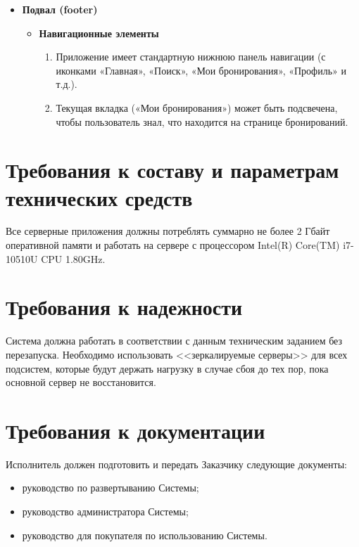 \begin{enumerate}
\begin{itemize}
            \item \textbf{Подвал (footer)}
            \begin{itemize}
                \item \textbf{Навигационные элементы}
                \begin{enumerate}
                    \item Приложение имеет стандартную нижнюю панель навигации (с иконками «Главная», «Поиск», «Мои бронирования», «Профиль» и т.д.).
                    \item Текущая вкладка («Мои бронирования») может быть подсвечена, чтобы пользователь знал, что находится на странице бронирований.
                \end{enumerate}
            \end{itemize}
        \end{itemize}    

\end{enumerate}

\section*{Требования к составу и параметрам технических средств}

Все серверные приложения должны потреблять суммарно не более 2 Гбайт оперативной памяти и работать на сервере с процессором Intel(R) Core(TM) i7- 10510U CPU 1.80GHz.

\section*{Требования к надежности}

Система должна работать в соответствии с данным техническим заданием без перезапуска.
Необходимо использовать <<зеркалируемые серверы>> для всех подсистем, которые будут держать нагрузку в случае сбоя до тех пор, пока основной сервер не восстановится.

\section*{Требования к документации}

Исполнитель должен подготовить и передать Заказчику следующие документы:

\begin{itemize}
    \item руководство по развертыванию Системы;
    \item руководство администратора Системы;
    \item руководство для покупателя по использованию Системы.
\end{itemize}